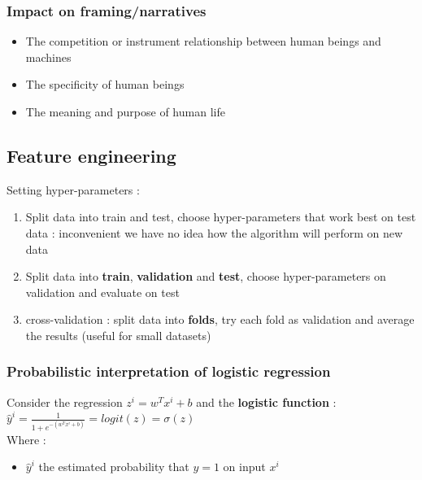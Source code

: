\documentclass[../main.tex]{subfiles}
\begin{document}
\subsubsection{Impact on framing/narratives}
\begin{itemize}
    \item The competition or instrument relationship between human beings and machines\\
    \item The specificity of human beings\\
    \item The meaning and purpose of human life\\
\end{itemize}

\subsection{Feature engineering}

Setting hyper-parameters : \begin{enumerate}
    \item Split data into train and test, choose hyper-parameters that work best on test data : inconvenient we have no idea how the algorithm will perform on new data\\
    \item Split data into \textbf{train}, \textbf{validation} and \textbf{test}, choose hyper-parameters on validation and evaluate on test\\
    \item cross-validation : split data into \textbf{folds}, try each fold as validation and average the results (useful for small datasets)\\
\end{enumerate}

\subsubsection{Probabilistic interpretation of logistic regression}
Consider the regression $z^i = w^Tx^i+b$ and the \textbf{logistic function} : \\
$\hat{y}^i = \frac{1}{1+e^{-(w^Tx^i+b)}} = logit(z) = \sigma(z)$\\
Where : \begin{itemize}
    \item $\hat{y}^i$ the estimated probability that $y=1$ on input $x^i$\\
\end{itemize}
\end{document}
